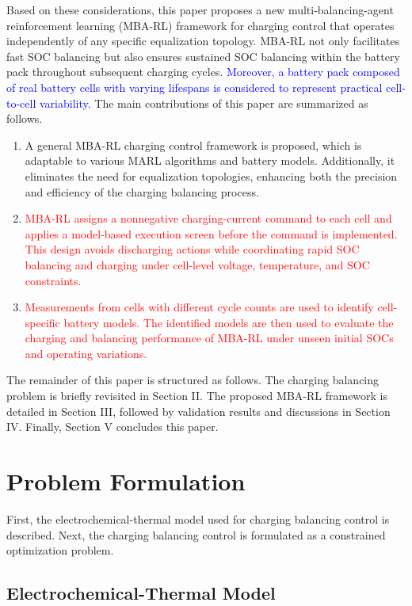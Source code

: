 \documentclass[journal]{IEEEtran}
\newcommand{\rev}[1]{\textcolor{blue}{#1}}
\newcommand{\newrev}[1]{\textcolor{red}{#1}}
\begin{document}
Based on these considerations, this paper proposes a new multi-balancing-agent reinforcement learning (MBA-RL) framework for charging control that operates independently of any specific equalization topology. MBA-RL not only facilitates fast SOC balancing but also ensures sustained SOC balancing within the battery pack throughout subsequent charging cycles. \rev{Moreover, a battery pack composed of real battery cells with varying lifespans is considered to represent practical cell-to-cell variability.} The main contributions of this paper are summarized as follows.
\begin{enumerate}
    \item A general MBA-RL charging control framework is proposed, which is adaptable to various MARL algorithms and battery models. Additionally, it eliminates the need for equalization topologies, enhancing both the precision and efficiency of the charging balancing process.
    
    \item \newrev{MBA-RL assigns a nonnegative charging-current command to each cell and applies a model-based execution screen before the command is implemented. This design avoids discharging actions while coordinating rapid SOC balancing and charging under cell-level voltage, temperature, and SOC constraints.}
    
    \item \newrev{Measurements from cells with different cycle counts are used to identify cell-specific battery models. The identified models are then used to evaluate the charging and balancing performance of MBA-RL under unseen initial SOCs and operating variations.}
\end{enumerate}

The remainder of this paper is structured as follows. The charging balancing problem is briefly revisited in Section II. The proposed MBA-RL framework is detailed in Section III, followed by validation results and discussions in Section IV. Finally, Section V concludes this paper.

\section{Problem Formulation}
First, the electrochemical-thermal model used for charging balancing control is described. Next, the charging balancing control is formulated as a constrained optimization problem.

\subsection{Electrochemical-Thermal Model}
\end{document}
